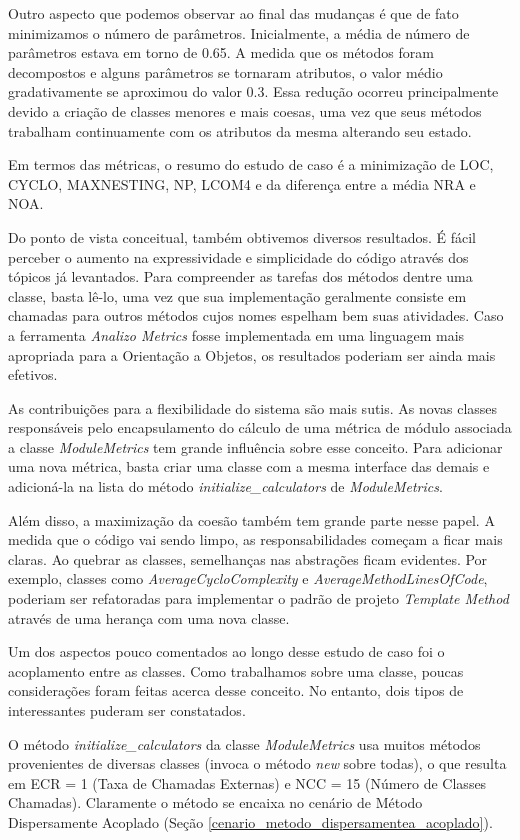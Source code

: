 Outro aspecto que podemos observar ao final das mudanças é que de fato minimizamos
o número de parâmetros. Inicialmente, a média de número de parâmetros estava em torno de 0.65.
A medida que os métodos foram decompostos e alguns parâmetros se tornaram atributos, o valor médio
gradativamente se aproximou do valor 0.3. Essa redução ocorreu principalmente devido a criação
de classes menores e mais coesas, uma vez que seus métodos trabalham continuamente com os
atributos da mesma alterando seu estado.

Em termos das métricas, o resumo do estudo de caso é a minimização de LOC, CYCLO, MAXNESTING, NP,
LCOM4 e da diferença entre a média NRA e NOA.

Do ponto de vista conceitual, também obtivemos diversos resultados. É fácil perceber o aumento
na expressividade e simplicidade do código através dos tópicos já levantados. Para compreender
as tarefas dos métodos dentre uma classe, basta lê-lo, uma vez que sua implementação geralmente
consiste em chamadas para outros métodos cujos nomes espelham bem suas atividades. Caso a ferramenta
\textit{Analizo Metrics} fosse implementada em uma linguagem mais apropriada para a Orientação
a Objetos, os resultados poderiam ser ainda mais efetivos.

As contribuições para a flexibilidade do sistema são mais sutis. As novas classes responsáveis
pelo encapsulamento do cálculo de uma métrica de módulo associada a classe \textit{ModuleMetrics}
tem grande influência sobre esse conceito. Para adicionar uma nova métrica, basta criar uma classe
com a mesma interface das demais e adicioná-la na lista do método \textit{initialize\_calculators} de
\textit{ModuleMetrics}.

Além disso, a maximização da coesão também tem grande parte nesse papel. A medida que o código
vai sendo limpo, as responsabilidades começam a ficar mais claras. Ao quebrar as classes,
semelhanças nas abstrações ficam evidentes. Por exemplo, classes como \textit{AverageCycloComplexity}
e \textit{AverageMethodLinesOfCode}, poderiam ser refatoradas para implementar o padrão de projeto
\textit{Template Method} \citep{GOF95} através de uma herança com uma nova classe.

Um dos aspectos pouco comentados ao longo desse estudo de caso foi o acoplamento entre as classes.
Como trabalhamos sobre uma classe, poucas considerações foram feitas acerca desse conceito. No
entanto, dois tipos de interessantes puderam ser constatados.

O método \textit{initialize\_calculators} da classe \textit{ModuleMetrics} usa muitos métodos
provenientes de diversas classes (invoca o método \textit{new} sobre todas), o que resulta em
ECR = 1 (Taxa de Chamadas Externas) e NCC = 15 (Número de Classes Chamadas).
Claramente o método se encaixa no cenário de Método Dispersamente Acoplado (Seção \ref{cenario_metodo_dispersamentea_acoplado}).

